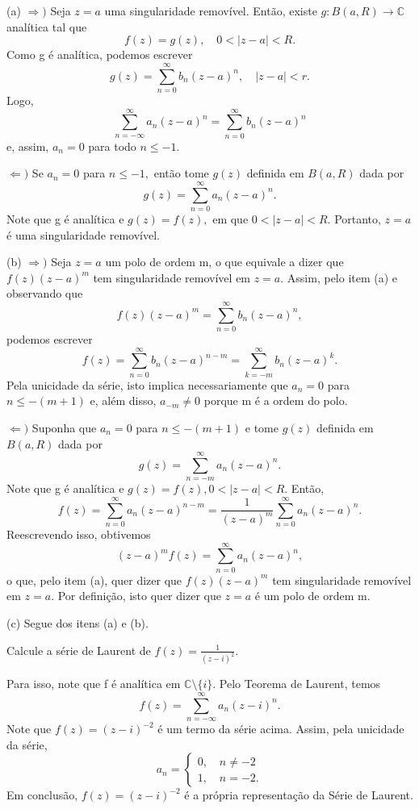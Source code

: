 \documentclass[ComplexAnalysis/complex.tex]{subfiles}
\begin{document}
\begin{proof*}
	(a) \(\Rightarrow )\) Seja \(z=a\) uma singularidade removível. Então, existe \(g:B(a, R)\rightarrow \mathbb{C}\) analítica tal que
	\[
		f(z) = g(z),\quad 0<|z-a|<R.
	\]
	Como g é analítica, podemos escrever
	\[
		g(z) = \sum\limits_{n=0}^{\infty}b_{n}(z-a)^{n},\quad |z-a| < r.
	\]
	Logo,
	\[
		\sum\limits_{n=-\infty}^{\infty}a_{n}(z-a)^{n} = \sum\limits_{n=0}^{\infty}b_{n}(z-a)^{n}
	\]
	e, assim, \(a_{n}=0\) para todo \(n\leq -1.\)

	\(\Leftarrow )\) Se \(a_{n}=0\) para \(n\leq -1,\) então tome \(g(z)\) definida em \(B(a, R)\) dada por
	\[
		g(z) = \sum\limits_{n=0}^{\infty}a_{n}(z-a)^{n}.
	\]
	Note que g é analítica e \(g(z) = f(z),\) em que \(0 < |z-a| < R.\) Portanto, \(z=a\) é uma singularidade removível.

	(b) \(\Rightarrow )\) Seja \(z=a\) um polo de ordem m, o que equivale a dizer que \(f(z)(z-a)^{m}\) tem singularidade removível em \(z=a\).
	Assim, pelo item (a) e observando que
	\[
		f(z)(z-a)^{m} = \sum\limits_{n=0}^{\infty}b_{n}(z-a)^{n},
	\]
	podemos escrever
	\[
		f(z) = \sum\limits_{n=0}^{\infty}b_{n}(z-a)^{n-m} = \sum\limits_{k=-m}^{\infty}b_{n}(z-a)^{k}.
	\]
	Pela unicidade da série, isto implica necessariamente que \(a_{n}=0\) para \(n\leq -(m+1)\) e, além disso, \(a_{-m}\neq0\) porque
	m é a ordem do polo.

	\(\Leftarrow )\) Suponha que \(a_{n} = 0\) para \(n\leq -(m+1)\) e tome \(g(z)\) definida em \(B(a, R)\) dada por
	\[
		g(z) = \sum\limits_{n=-m}^{\infty}a_{n}(z-a)^{n}.
	\]
	Note que g é analítica e \(g(z) = f(z), 0 < |z-a| < R.\) Então,
	\[
		f(z) = \sum\limits_{n=0}^{\infty}a_{n}(z-a)^{n-m} = \frac{1}{(z-a)^{m}}\sum\limits_{n=0}^{\infty}a_{n}(z-a)^{n}.
	\]
	Reescrevendo isso, obtivemos
	\[
		(z-a)^{m}f(z) = \sum\limits_{n=0}^{\infty}a_{n}(z-a)^{n},
	\]
	o que, pelo item (a), quer dizer que \(f(z)(z-a)^{m}\) tem singularidade removível em \(z=a.\) Por definição, isto quer dizer que
	\(z=a\) é um polo de ordem m.

	(c) Segue dos itens (a) e (b). \qedsymbol
\end{proof*}
\begin{example}
	Calcule a série de Laurent de \(f(z) = \frac{1}{(z-i)^{2}}.\)

	Para isso, note que f é analítica em \(\mathbb{C}\setminus{\{i\}}.\) Pelo Teorema de Laurent, temos
	\[
		f(z) = \sum\limits_{n=-\infty}^{\infty}a_{n}(z-i)^{n}.
	\]
	Note que \(f(z) = (z-i)^{-2}\) é um termo da série acima. Assim, pela unicidade da série,
	\[
		a_{n} = \left\{\begin{array}{ll}
			0,\quad n\neq-2 \\
			1,\quad n = -2.
		\end{array}\right.
	\]
	Em conclusão, \(f(z) = (z-i)^{-2}\) é a própria representação da Série de Laurent.
\end{example}
\end{document}
